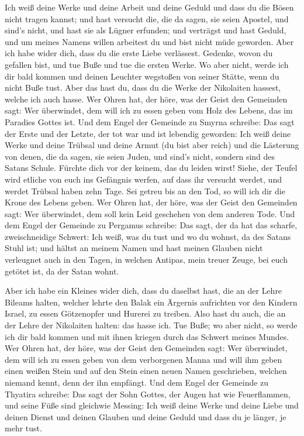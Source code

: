  Ich weiß deine Werke und deine Arbeit und deine Geduld
und dass du die Bösen nicht tragen kannst; und hast versucht die, die da
sagen, sie seien Apostel, und sind's nicht, und hast sie als Lügner
erfunden;  und verträgst und hast Geduld, und um meines
Namens willen arbeitest du und bist nicht müde geworden. 
Aber ich habe wider dich, dass du die erste Liebe verlässest.
 Gedenke, wovon du gefallen bist, und tue Buße und tue die
ersten Werke. Wo aber nicht, werde ich dir bald kommen und deinen
Leuchter wegstoßen von seiner Stätte, wenn du nicht Buße tust.
 Aber das hast du, dass du die Werke der Nikolaiten
hassest, welche ich auch hasse.  Wer Ohren hat, der höre,
was der Geist den Gemeinden sagt: Wer überwindet, dem will ich zu essen
geben vom Holz des Lebens, das im Paradies Gottes ist. 
Und dem Engel der Gemeinde zu Smyrna schreibe: Das sagt der Erste und
der Letzte, der tot war und ist lebendig geworden:  Ich
weiß deine Werke und deine Trübsal und deine Armut (du bist aber reich)
und die Lästerung von denen, die da sagen, sie seien Juden, und sind's
nicht, sondern sind des Satans Schule.  Fürchte dich vor
der keinem, das du leiden wirst! Siehe, der Teufel wird etliche von euch
ins Gefängnis werfen, auf dass ihr versucht werdet, und werdet Trübsal
haben zehn Tage. Sei getreu bis an den Tod, so will ich dir die Krone
des Lebens geben.  Wer Ohren hat, der höre, was der Geist
den Gemeinden sagt: Wer überwindet, dem soll kein Leid geschehen von dem
anderen Tode.  Und dem Engel der Gemeinde zu Pergamus
schreibe: Das sagt, der da hat das scharfe, zweischneidige Schwert:
 Ich weiß, was du tust und wo du wohnst, da des Satans
Stuhl ist; und hältst an meinem Namen und hast meinen Glauben nicht
verleugnet auch in den Tagen, in welchen Antipas, mein treuer Zeuge, bei
euch getötet ist, da der Satan wohnt.

 Aber ich habe ein Kleines wider dich, dass du daselbst
hast, die an der Lehre Bileams halten, welcher lehrte den Balak ein
Ärgernis aufrichten vor den Kindern Israel, zu essen Götzenopfer und
Hurerei zu treiben.  Also hast du auch, die an der Lehre
der Nikolaiten halten: das hasse ich.  Tue Buße; wo aber
nicht, so werde ich dir bald kommen und mit ihnen kriegen durch das
Schwert meines Mundes.  Wer Ohren hat, der höre, was der
Geist den Gemeinden sagt: Wer überwindet, dem will ich zu essen geben
von dem verborgenen Manna und will ihm geben einen weißen Stein und auf
den Stein einen neuen Namen geschrieben, welchen niemand kennt, denn der
ihn empfängt.  Und dem Engel der Gemeinde zu Thyatira
schreibe: Das sagt der Sohn Gottes, der Augen hat wie Feuerflammen, und
seine Füße sind gleichwie Messing:  Ich weiß deine Werke
und deine Liebe und deinen Dienst und deinen Glauben und deine Geduld
und dass du je länger, je mehr tust.

